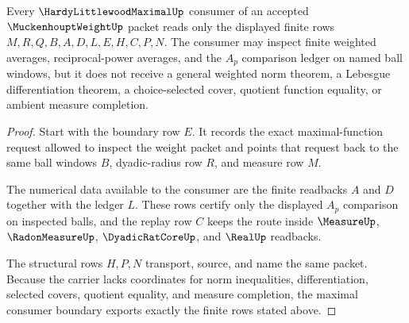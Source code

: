 \begin{theorem}
\label{thm:muckenhoupt-weight-maximal-consumer-boundary}
Every $\HardyLittlewoodMaximalUp$ consumer of an accepted $\MuckenhouptWeightUp$ packet reads only the displayed finite rows $M,R,Q,B,A,D,L,E,H,C,P,N$. The consumer may inspect finite weighted averages, reciprocal-power averages, and the $A_p$ comparison ledger on named ball windows, but it does not receive a general weighted norm theorem, a Lebesgue differentiation theorem, a choice-selected cover, quotient function equality, or ambient measure completion.
\end{theorem}
\begin{proof}
Start with the boundary row $E$. It records the exact maximal-function request allowed to inspect the weight packet and points that request back to the same ball windows $B$, dyadic-radius row $R$, and measure row $M$.

The numerical data available to the consumer are the finite readbacks $A$ and $D$ together with the ledger $L$. These rows certify only the displayed $A_p$ comparison on inspected balls, and the replay row $C$ keeps the route inside $\MeasureUp$, $\RadonMeasureUp$, $\DyadicRatCoreUp$, and $\RealUp$ readbacks.

The structural rows $H,P,N$ transport, source, and name the same packet. Because the carrier lacks coordinates for norm inequalities, differentiation, selected covers, quotient equality, and measure completion, the maximal consumer boundary exports exactly the finite rows stated above.
\end{proof}


\begin{closurestatus}{\MuckenhouptWeightUp}
  \theoryclosure{\seedClosure}
  \formalstatus{\unformalizedV}
\end{closurestatus}
